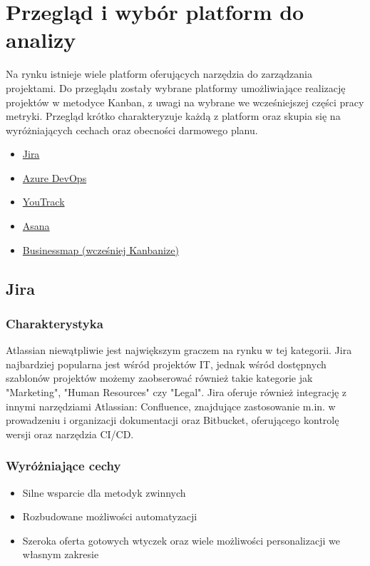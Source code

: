 \section*{Przegląd i wybór platform do analizy}
Na rynku istnieje wiele platform oferujących narzędzia do zarządzania projektami. Do przeglądu zostały wybrane platformy umożliwiające realizację projektów w metodyce Kanban, z uwagi na wybrane we wcześniejszej
części pracy metryki. Przegląd krótko charakteryzuje każdą z platform oraz skupia się na wyróżniających cechach oraz obecności darmowego planu.
\begin{itemize}
    \item \href{https://www.atlassian.com/software/jira}{Jira}
    \item \href{https://azure.microsoft.com/en-us/products/devops/}{Azure DevOps}
    \item \href{https://www.jetbrains.com/youtrack/}{YouTrack}
    \item \href{https://asana.com/}{Asana}
    \item \href{https://businessmap.io/}{Businessmap (wcześniej Kanbanize)}
\end{itemize}

\subsection*{Jira}
\subsubsection*{Charakterystyka}
Atlassian niewątpliwie jest największym graczem na rynku w tej kategorii. Jira najbardziej popularna jest wśród projektów IT, jednak wśród dostępnych szablonów projektów możemy zaobserować również takie
kategorie jak "Marketing", "Human Resources" czy "Legal". Jira oferuje również integrację z innymi narzędziami Atlassian: Confluence, znajdujące zastosowanie m.in. w prowadzeniu i organizacji dokumentacji oraz
Bitbucket, oferującego kontrolę wersji oraz narzędzia CI/CD.
\subsubsection*{Wyróżniające cechy}
\begin{itemize}
    \item Silne wsparcie dla metodyk zwinnych
    \item Rozbudowane możliwości automatyzacji
    \item Szeroka oferta gotowych wtyczek oraz wiele możliwości personalizacji we własnym zakresie
\end{itemize}
